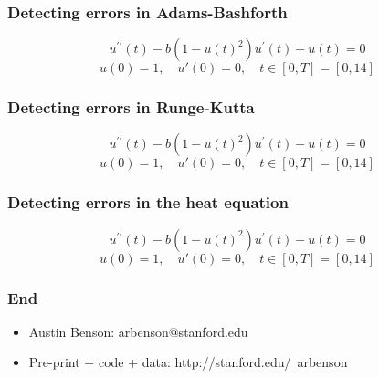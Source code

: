 \documentclass{beamer}
\begin{document}

%
\begin{frame}
\frametitle{Detecting errors in Adams-Bashforth}

\[
u^{\prime\prime}(t) - b(1 - u(t)^2)u^{\prime}(t) + u(t) = 0
\]
\[
u(0) = 1, \quad u'(0) = 0, \quad t \in [0, T] = [0, 14]
\]

\end{frame}

%
\begin{frame}
\frametitle{Detecting errors in Runge-Kutta}

\[
u^{\prime\prime}(t) - b(1 - u(t)^2)u^{\prime}(t) + u(t) = 0
\]
\[
u(0) = 1, \quad u'(0) = 0, \quad t \in [0, T] = [0, 14]
\]

\end{frame}


%
\begin{frame}
\frametitle{Detecting errors in the heat equation}

\[
u^{\prime\prime}(t) - b(1 - u(t)^2)u^{\prime}(t) + u(t) = 0
\]
\[
u(0) = 1, \quad u'(0) = 0, \quad t \in [0, T] = [0, 14]
\]
\end{frame}


%
\begin{frame}
\frametitle{End}

\begin{itemize}
\item Austin Benson: arbenson@stanford.edu
\item Pre-print + code + data: http://stanford.edu/~arbenson
\end{itemize}
\end{frame}
\end{document}
